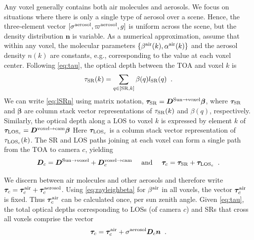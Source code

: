 \documentclass[10pt,letterpaper]{article}
\newcommand{\OpDistance}{\bm{D}}
\newcommand{\vect}[1]{\bm{#1}}
\begin{document}
Any voxel generally contains both air molecules and aerosols.  We
focus on situations where there is only a single type of aerosol over
a scene. Hence, the three-element vector $[{\sigma}^{\rm
  aerosol},\varpi^{\rm aerosol},g]$ is uniform across the scene, but
the density distribution ${\bm n}$ is variable. As a numerical
approximation, assume that within any voxel, the molecular parameters
$\{ \beta^{\rm air}(k),\alpha^{\rm air}(k)\}$ and the aerosol density
$n(k)$ are constants, e.g., corresponding to the value at each voxel
center.  Following \cref{eq:tau}, the optical depth between the TOA
and voxel $k$ is
\begin{equation}
  \tau_{\rm SR}(k)= \sum_{q \in[{\rm SR},k]} \beta(q) l_{\rm SR}(q) \;\;.
  \label{eq:lSRn}
\end{equation}
We can write \cref{eq:lSRn} using matrix notation, $\vect{\tau}_{\rm
  SR}=\OpDistance^{\mathrm{Sun \rightarrow voxel}} \vect{\beta}$,
where $\vect{\tau}_{\rm SR}$ and $\vect{\beta}$ are column stack
vector representations of $\tau_{\rm SR}(k)$ and $\beta(q)$,
respectively. Similarly, the optical depth along a LOS to voxel $k$ is
expressed by element $k$ of $\vect{\tau}_{{\rm LOS}_c} =
\OpDistance^{\mathrm{voxel \rightarrow cam}} \vect{\beta}$ Here
$\vect{\tau}_{{\rm LOS}_c}$ is a column stack vector representation of
$\tau_{{\rm LOS}_c}(k)$.  The SR and LOS paths joining at each voxel
can form a single path from the TOA to camera $c$, yielding
\begin{equation}
  {\bm D}_c=
  {\bm D}^{\mathrm{Sun \rightarrow voxel}}+
  {\bm D}^{\mathrm{voxel \rightarrow cam}}_c
  \quad\text{ and }\quad
  \vect{\tau}_c=
  \vect{\tau}_{\rm SR}+
  \vect{\tau}_{{\rm LOS}_c}
  \;\;.
  \label{eq:D_tau_total}
\end{equation}

We discern between air molecules and other aerosols and therefore
write $ \vect{\tau}_c= \vect{\tau}_c^{\rm air} + \vect{\tau}_c^{\rm
  aerosol}$.  Using \cref{eq:rayleighbeta} for $\beta^{\rm air}$ in
all voxels, the vector $\vect{\tau}_c^{\rm air}$ is fixed. Thus
$\vect{\tau}_c^{\rm air}$ can be calculated once, per sun zenith
angle. Given \cref{eq:tau}, the total optical depths
corresponding to LOSs (of camera $c$) and SRs that cross all voxels
comprise the vector
\begin{equation}
  \vect{\tau}_c= \vect{\tau}_c^{\rm air}
  + \sigma^{\rm aerosol} {\bm D}_c {\bm n}
  \;\;.
  \label{eq:tautotal}
\end{equation}

\end{document}
